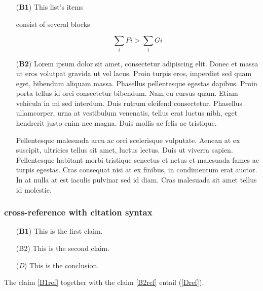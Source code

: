 \documentclass[
]{article}
\makeatletter
\providecommand{\tightlist}{%
  \setlength{\itemsep}{0pt}\setlength{\parskip}{0pt}}
\def\labelledlistlabel#1#2{\begingroup
    \def\@currentlabel{#2}%
    \label{#1}\endgroup
    }
\makeatother
\begin{document}
\begin{itemize}
\tightlist

\item[(\textbf{B1})] This list's items

consist of several blocks

\[\sum_i Fi > \sum_i Gi\]

\item[(\textbf{B2})] Lorem ipsum dolor sit amet, consectetur adipiscing
elit. Donec et massa ut eros volutpat gravida ut vel lacus. Proin turpis
eros, imperdiet sed quam eget, bibendum aliquam massa. Phasellus
pellentesque egestas dapibus. Proin porta tellus id orci consectetur
bibendum. Nam eu cursus quam. Etiam vehicula in mi sed interdum. Duis
rutrum eleifend consectetur. Phasellus ullamcorper, urna at vestibulum
venenatis, tellus erat luctus nibh, eget hendrerit justo enim nec magna.
Duis mollis ac felis ac tristique.

Pellentesque malesuada arcu ac orci scelerisque vulputate. Aenean at ex
suscipit, ultricies tellus sit amet, luctus lectus. Duis ut viverra
sapien. Pellentesque habitant morbi tristique senectus et netus et
malesuada fames ac turpis egestas. Cras consequat nisi at ex finibus, in
condimentum erat auctor. In at nulla at est iaculis pulvinar sed id
diam. Cras malesuada sit amet tellus id molestie.

\end{itemize}

\hypertarget{cross-reference-with-citation-syntax}{%
\subsubsection{cross-reference with citation
syntax}\label{cross-reference-with-citation-syntax}}

\begin{itemize}
\tightlist

\item[(\textbf{B1})\labelledlistlabel{B1ref}{\textbf{B1}}] This is the
first claim.

\item[(B2)\labelledlistlabel{B2ref}{B2}] This is the second claim.

\item[(\emph{D})\labelledlistlabel{Dref}{\emph{D}}] This is the
conclusion.

\end{itemize}

The claim \ref{B1ref} together with the claim \ref{B2ref} entail
(\ref{Dref}).
\end{document}
